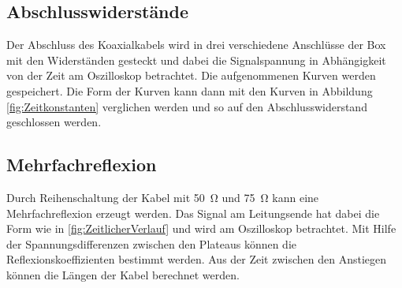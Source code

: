 \subsection*{Abschlusswiderstände}
Der Abschluss des Koaxialkabels wird in drei verschiedene Anschlüsse der Box mit den Widerständen gesteckt und dabei die Signalspannung in Abhängigkeit von der Zeit am Oszilloskop betrachtet. Die aufgenommenen Kurven werden gespeichert. Die Form der Kurven kann dann mit den Kurven in Abbildung \ref{fig:Zeitkonstanten} verglichen werden und so auf den Abschlusswiderstand geschlossen werden.
\subsection*{Mehrfachreflexion}
Durch Reihenschaltung der Kabel mit \SI{50}{\ohm} und \SI{75}{\ohm} kann eine Mehrfachreflexion erzeugt werden. Das Signal am Leitungsende hat dabei die Form wie in \ref{fig:ZeitlicherVerlauf} und wird am Oszilloskop betrachtet. Mit Hilfe der Spannungsdifferenzen zwischen den Plateaus können die Reflexionskoeffizienten bestimmt werden. Aus der Zeit zwischen den Anstiegen können die Längen der Kabel berechnet werden.
